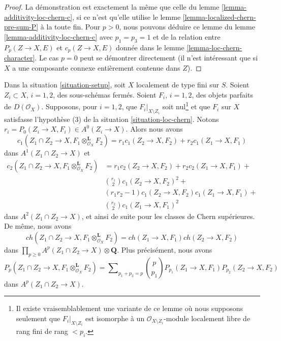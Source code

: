 \begin{proof}
La démonstration est exactement la même que celle du
lemme \ref{lemma-additivity-loc-chern-c},
si ce n'est qu'elle utilise le
lemme \ref{lemma-localized-chern-pre-sum-P}
à la toute fin. Pour $p > 0$, nous pouvons déduire ce lemme
du lemme \ref{lemma-additivity-loc-chern-c} avec $p_1 = p_3 = 1$
et de la relation entre $P_p(Z \to X, E)$ et $c_p(Z \to X, E)$ donnée dans le
lemme \ref{lemma-loc-chern-character}. Le cas $p = 0$ peut se démontrer
directement (il n'est intéressant que si $X$ a une composante connexe
entièrement contenue dans $Z$).
\end{proof}

\begin{lemma}
\label{lemma-loc-chern-tensor-product}
Dans la situation \ref{situation-setup}, soit $X$ localement de type fini sur $S$.
Soient $Z_i \subset X$, $i = 1, 2$, des sous-schémas fermés. Soient $F_i$, $i = 1, 2$,
des objets parfaits de $D(\mathcal{O}_X)$. Supposons, pour $i = 1, 2$, que
$F_i|_{X \setminus Z_i}$ soit nul\footnote{Il existe vraisemblablement une
variante de ce lemme où nous supposons seulement que $F_i|_{X \setminus Z_i}$
est isomorphe à un $\mathcal{O}_{X \setminus Z_i}$-module localement libre de rang fini
de rang $< p_i$.} et que $F_i$ sur $X$ satisfasse l'hypothèse
(3) de la situation \ref{situation-loc-chern}. Notons
$r_i = P_0(Z_i \to X, F_i) \in A^0(Z_i \to X)$.
Alors nous avons
$$
c_1(Z_1 \cap Z_2 \to X, F_1 \otimes_{\mathcal{O}_X}^\mathbf{L} F_2) =
r_1 c_1(Z_2 \to X, F_2) + r_2 c_1(Z_1 \to X, F_1)
$$
dans $A^1(Z_1 \cap Z_2 \to X)$ et
\begin{align*}
c_2(Z_1 \cap Z_2 \to X, F_1 \otimes_{\mathcal{O}_X}^\mathbf{L} F_2)
& =
r_1 c_2(Z_2 \to X, F_2) +
r_2 c_2(Z_1 \to X, F_1) + \\
& {r_1 \choose 2} c_1(Z_2 \to X, F_2)^2 + \\
& (r_1r_2 - 1) c_1(Z_2 \to X, F_2)c_1(Z_1 \to X, F_1) + \\
& {r_2 \choose 2} c_1(Z_1 \to X, F_1)^2
\end{align*}
dans $A^2(Z_1 \cap Z_2 \to X)$, et ainsi de suite pour les classes de Chern supérieures.
De même, nous avons
$$
ch(Z_1 \cap Z_2 \to X, F_1 \otimes_{\mathcal{O}_X}^\mathbf{L} F_2) =
ch(Z_1 \to X, F_1) ch(Z_2 \to X, F_2)
$$
dans $\prod_{p \geq 0} A^p(Z_1 \cap Z_2 \to X) \otimes \mathbf{Q}$.
Plus précisément, nous avons
$$
P_p(Z_1 \cap Z_2 \to X, F_1 \otimes_{\mathcal{O}_X}^\mathbf{L} F_2) =
\sum\nolimits_{p_1 + p_2 = p}
{p \choose p_1} P_{p_1}(Z_1 \to X, F_1) P_{p_2}(Z_2 \to X, F_2)
$$
dans $A^p(Z_1 \cap Z_2 \to X)$.
\end{lemma}

